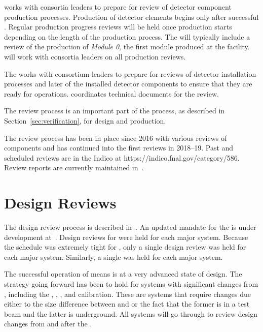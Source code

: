  works with consortia leaders to prepare for review of
detector component production processes.  Production of detector
elements begins only after successful . Regular production
progress reviews will be held once production starts depending on the
length of the production process. The  will typically
include a review of the production of \textit{Module 0}, the first
module produced at the facility.  will work with consortia
leaders on all production reviews.

The  works with consortium leaders to prepare for reviews of
detector installation processes %
and later of the installed detector components to
ensure that they are ready for operations.   coordinates
technical documents for the   review.

The review process is an important part of the  
process, as described in Section~\ref{sec:verification}, for
design and production.

The review process has been in place since 2016 with various reviews
of  components and has continued into the first
 reviews in 2018--19. Past and scheduled reviews are in
the  Indico at https://indico.fnal.gov/category/586.
Review reports are currently maintained in~.

\section{Design Reviews}

The  design review process is described
in~. An updated mandate for the   is under
development at~\cite{bib:cernedms2173197}. %
Design reviews
for  were held for each major system. Because the
schedule was extremely tight for , only a single
design review was held for each major system. Similarly, a single
 was held for each major system.

The successful operation of  means  is at
a very advanced state of design. The strategy going forward has been
to hold  for systems with significant changes from
, including the , ,
, and calibration. These are systems that require changes
due either to the size difference between  and 
or the fact that the former is in a test beam and the latter is underground. All
systems will go through  to review design changes from
 and  after the .

